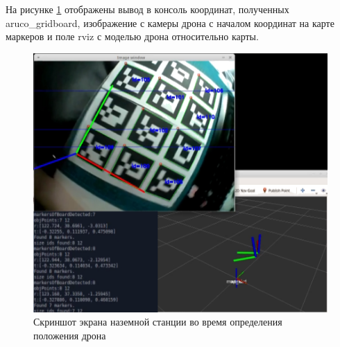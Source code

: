 На рисунке \ref{fig:px4} отображены вывод в консоль координат, полученных aru\-co\_g\-rid\-board, изображение с камеры дрона с началом координат на карте маркеров и поле rviz с моделью дрона относительно карты.
\begin{figure}[H]
	\centering
	\includegraphics[width=0.7\linewidth]{pics/px4}
	\caption{ Скриншот экрана наземной станции во время определения положения дрона
	}
	\label{fig:px4}
\end{figure}

